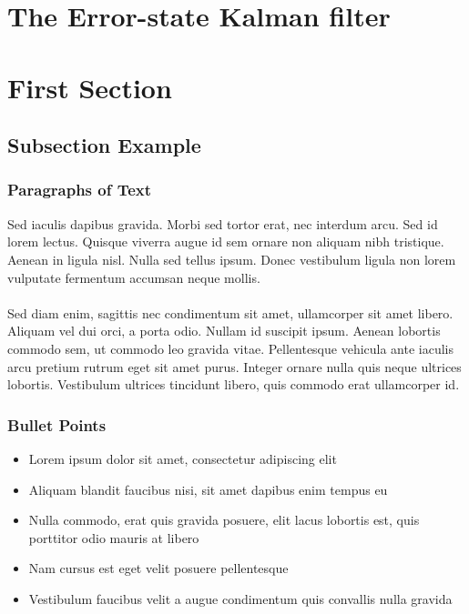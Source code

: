 \documentclass{beamer}
\begin{document}

\section{The Error-state Kalman filter}

\section{First Section} %

\subsection{Subsection Example} %

\begin{frame}
\frametitle{Paragraphs of Text}
Sed iaculis dapibus gravida. Morbi sed tortor erat, nec interdum arcu. Sed id lorem lectus. Quisque viverra augue id sem ornare non aliquam nibh tristique. Aenean in ligula nisl. Nulla sed tellus ipsum. Donec vestibulum ligula non lorem vulputate fermentum accumsan neque mollis.\\~\\

Sed diam enim, sagittis nec condimentum sit amet, ullamcorper sit amet libero. Aliquam vel dui orci, a porta odio. Nullam id suscipit ipsum. Aenean lobortis commodo sem, ut commodo leo gravida vitae. Pellentesque vehicula ante iaculis arcu pretium rutrum eget sit amet purus. Integer ornare nulla quis neque ultrices lobortis. Vestibulum ultrices tincidunt libero, quis commodo erat ullamcorper id.
\end{frame}


\begin{frame}
\frametitle{Bullet Points}
\begin{itemize}
\item Lorem ipsum dolor sit amet, consectetur adipiscing elit
\item Aliquam blandit faucibus nisi, sit amet dapibus enim tempus eu
\item Nulla commodo, erat quis gravida posuere, elit lacus lobortis est, quis porttitor odio mauris at libero
\item Nam cursus est eget velit posuere pellentesque
\item Vestibulum faucibus velit a augue condimentum quis convallis nulla gravida
\end{itemize}
\end{frame}
\end{document}
